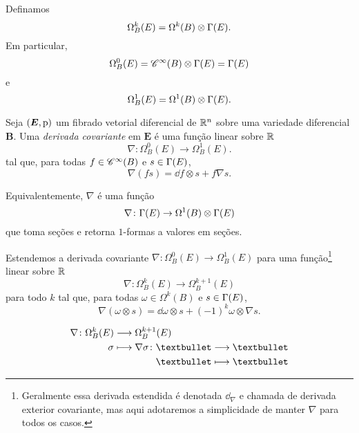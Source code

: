 Definamos
	\begin{equation*}
	\Omega^k_B(E) = \Omega^k(B) \otimes \Gamma(E).
	\end{equation*}
Em particular,
	\begin{equation*}
	\Omega^0_B(E) = \mathscr{C}^\infty(B) \otimes \Gamma(E) = \Gamma(E)
	\end{equation*}
e
	\begin{equation*}
	\Omega^1_B(E) = \Omega^1(B) \otimes \Gamma(E).
	\end{equation*}

\begin{definition}
Seja $(\bm E,\mathrm{p})$ um fibrado vetorial diferencial de $\mathbb{R}^n$ sobre uma variedade diferencial $\bm B$. Uma \emph{derivada covariante} em $\bm E$ é uma função linear sobre $\mathbb{R}$
	\begin{equation*}
	\nabla\colon \Omega^0_B(E) \to \Omega^1_B(E).
	\end{equation*}
tal que, para todas $f \in \mathscr{C}^\infty(B)$ e $s \in \Gamma(E)$,
	\begin{equation*}
	\nabla(fs) = \dd f \otimes s + f \nabla s.
	\end{equation*}
\end{definition}

Equivalentemente, $\nabla$ é uma função
	\begin{equation*}
	\nabla\colon \Gamma(E) \to \Omega^1(B) \otimes \Gamma(E)
	\end{equation*}
que toma seções e retorna $1$-formas a valores em seções.


Estendemos a derivada covariante $\nabla\colon \Omega^0_B(E) \to \Omega^1_B(E)$ para uma função\footnote{Geralmente essa derivada estendida é denotada $\dd_\nabla$ e chamada de derivada exterior covariante, mas aqui adotaremos a simplicidade de manter $\nabla$ para todos os casos.} linear sobre $\mathbb{R}$
	\begin{equation*}
	\nabla\colon \Omega^k_B(E) \to \Omega^{k+1}_B(E)
	\end{equation*}
para todo $k$ tal que, para todas $\omega \in \Omega^k(B)$ e $s \in \Gamma(E)$,
	\begin{equation*}
	\nabla(\omega \otimes s) = \dd \omega \otimes s + (-1)^k \omega \otimes \nabla s.
	\end{equation*}

	\begin{align*}
	\func{\nabla}{\Omega^k_B(E)}{\Omega^{k+1}_B(E)}{\sigma}{
		\begin{aligned}[t]
		\func{\nabla \sigma}{•}{•}{•}{•}
		\end{aligned}	
	}
	\end{align*}








